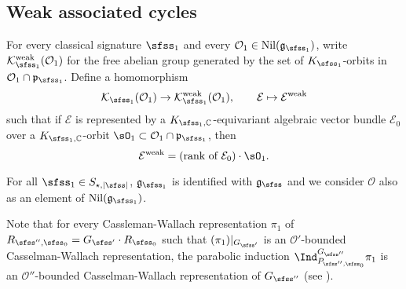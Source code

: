 \documentclass[12pt,a4paper]{amsart}
\def\abs#1{\left|{#1}\right|}
\newcommand{\CE}{{\mathcal {E}}}
\newcommand{\CK}{{\mathcal {K}}}
\newcommand{\CO}{{\mathcal {O}}}
\newcommand{\g}{\mathfrak g}
\newcommand{\p}{\mathfrak p}
\numberwithin{equation}{section}
\theoremstyle{remark}
\begin{document}
\subsection{Weak associated cycles}

For every classical signature $\sfss_1$ and every $\CO_1\in \mathrm{Nil}(\g_{\sfss_1})$, write $\CK^{\mathrm{weak}}_{\sfss_1}(\CO_1)$
for the free abelian group generated by the set of $K_{\sfss_1}$-orbits in $\CO_1\cap \p_{\sfss_1}$. Define a homomorphism
\[
  \CK_{\sfss_1}(\CO_1)\rightarrow \CK^{\mathrm{weak}}_{\sfss_1}(\CO_1), \qquad \CE\mapsto \CE^{\mathrm{weak}}
\]
such that if $\CE$ is represented by a $K_{\sfss_1,\C}$-equivariant algebraic vector bundle $\CE_0$ over a $K_{\sfss_1,\C}$-orbit $\sO_1\subset \CO_1\cap \p_{\sfss_1}$, then
\[
   \CE^{\mathrm{weak}}=\textrm{(rank of $\CE_0$)}\cdot \sO_1.
\]

For all $\sfss_1\in S_{\star, \abs{\sfss}}$,  $\g_{\sfss_1}$ is identified with $\g_{\sfss}$ and we consider $\CO$ also as an element of $\mathrm{Nil}(\g_{\sfss_1})$.


Note that for every Cassleman-Wallach representation $\pi_1$ of $R_{\sfss'',\sfss_0}=G_{\sfss'}\cdot R_{\sfss_0}$ such that $(\pi_1)|_{G_{\sfss'}}$ is an $\CO'$-bounded Casselman-Wallach representation,   the parabolic induction
$\Ind_{P_{\sfss'',\sfss_0}}^{G_{\sfss''}} \pi_1$ is an $\CO''$-bounded Casselman-Wallach representation  of $G_{\sfss''}$ (see \cite[Corollary~5.0.10]{B.Orbit}).
\end{document}
